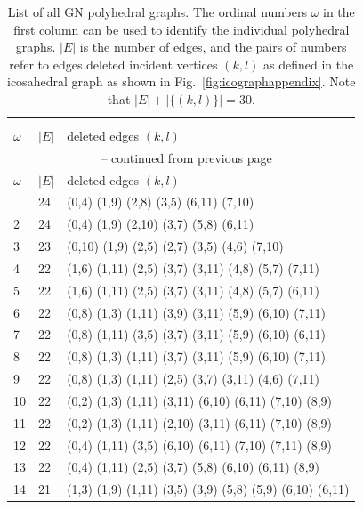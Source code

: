 \begin{appendix}
\footnotesize{\begin{longtable}{lll}
    \caption{List of all GN polyhedral graphs. The ordinal numbers $\omega$ in the first column
    can be used to identify the individual polyhedral graphs. 
    $|E|$ is the number of edges, and the pairs of numbers refer to edges deleted
    incident vertices $(k,l)$ as defined in the icosahedral graph 
    as shown in Fig.~\ref{fig:icographappendix}. Note that $|E|+|\{(k,l)\}|=30.$}\\
    \label{tab:icosubgraphs}\\
\toprule 
    $\omega$  & $|E|$  &  deleted edges $(k,l)$\\\midrule
\endfirsthead
\multicolumn{3}{c}{\tablename~\thetable{} -- continued from previous page}\\
\toprule 
    $\omega$  & $|E|$  &  deleted edges $(k,l)$\\\midrule
\endhead
\bottomrule\endfoot
    1  & 24 & (0,4)   (1,9)   (2,8)   (3,5)   (6,11)  (7,10)          \\
    2  & 24 & (0,4)   (1,9)   (2,10)  (3,7)   (5,8)   (6,11)          \\
    3  & 23 & (0,10)  (1,9)   (2,5)   (2,7)   (3,5)   (4,6)   (7,10)      \\
    4  & 22 & (1,6)   (1,11)  (2,5)   (3,7)   (3,11)  (4,8)   (5,7)   (7,11)  \\
    5  & 22 & (1,6)   (1,11)  (2,5)   (3,7)   (3,11)  (4,8)   (5,7)   (6,11)  \\
    6  & 22 & (0,8)   (1,3)   (1,11)  (3,9)   (3,11)  (5,9)   (6,10)  (7,11)  \\
    7  & 22 & (0,8)   (1,11)  (3,5)   (3,7)   (3,11)  (5,9)   (6,10)  (6,11)  \\
    8  & 22 & (0,8)   (1,3)   (1,11)  (3,7)   (3,11)  (5,9)   (6,10)  (7,11)  \\
    9  & 22 & (0,8)   (1,3)   (1,11)  (2,5)   (3,7)   (3,11)  (4,6)   (7,11)  \\
    10 & 22 & (0,2)   (1,3)   (1,11)  (3,11)  (6,10)  (6,11)  (7,10)  (8,9)   \\
    11 & 22 & (0,2)   (1,3)   (1,11)  (2,10)  (3,11)  (6,11)  (7,10)  (8,9)   \\
    12 & 22 & (0,4)   (1,11)  (3,5)   (6,10)  (6,11)  (7,10)  (7,11)  (8,9)   \\
    13 & 22 & (0,4)   (1,11)  (2,5)   (3,7)   (5,8)   (6,10)  (6,11)  (8,9)   \\
    14 & 21 & (1,3)   (1,9)   (1,11)  (3,5)   (3,9)   (5,8)   (5,9)   (6,10)  (6,11)\\

\end{longtable}}
\end{appendix}
